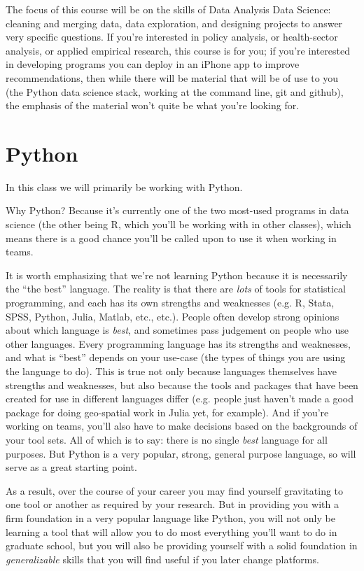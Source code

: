 \documentclass[12pt]{article}
\begin{document}
The focus of this course will be on the skills of Data Analysis Data Science: cleaning and merging data, data exploration, and designing projects to answer very specific questions. If you're interested in policy analysis, or health-sector analysis, or applied empirical research, this course is for you; if you're interested in developing programs you can deploy in an iPhone app to improve recommendations, then while there will be material that will be of use to you (the Python data science stack, working at the command line, git and github), the emphasis of the material won't quite be what you're looking for.

\section{Python}

In this class we will primarily be working with Python.

Why Python? Because it's currently one of the two most-used programs in data science (the other being R, which you'll be working with in other classes), which means there is a good chance you'll be called upon to use it when working in teams.

It is worth emphasizing that we're not learning Python because it is necessarily the ``the best'' language. The reality is that there are \emph{lots} of tools for statistical programming, and each has its own strengths and weaknesses (e.g. R, Stata, SPSS, Python, Julia, Matlab, etc., etc.). People often develop strong opinions about which language is \emph{best}, and sometimes pass judgement on people who use other languages. Every programming language has its strengths and weaknesses, and what is ``best'' depends on your use-case (the types of things you are using the language to do). This is true not only because languages themselves have strengths and weaknesses, but also because the tools and packages that have been created for use in different languages differ (e.g. people just haven't made a good package for doing geo-spatial work in Julia yet, for example). And if you're working on teams, you'll also have to make decisions based on the backgrounds of your tool sets. All of which is to say: there is no single \emph{best} language for all purposes. But Python is a very popular, strong, general purpose language, so will serve as a great starting point.

As a result, over the course of your career you may find yourself gravitating to one tool or another as required by your research. But in providing you with a firm foundation in a very popular language like Python, you will not only be learning a tool that will allow you to do most everything you'll want to do in graduate school, but you will also be providing yourself with a solid foundation in \emph{generalizable} skills that you will find useful if you later change platforms.
\end{document}
